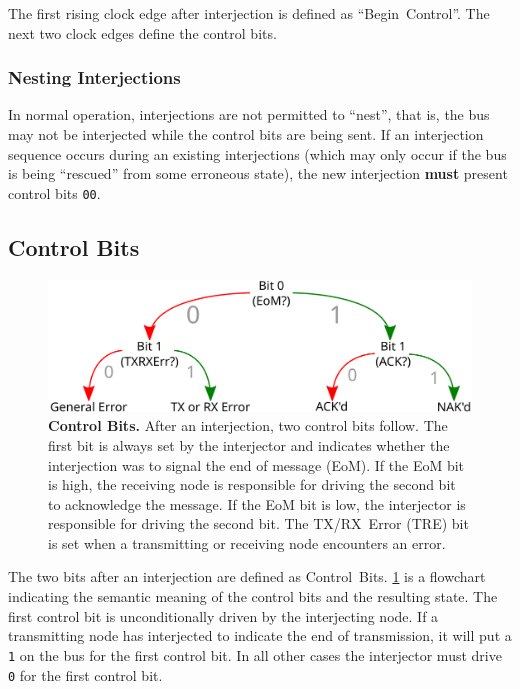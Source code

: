 The first rising clock edge after interjection is defined as ``Begin~Control''.
The next two clock edges define the control bits.

\subsubsection{Nesting Interjections}
In normal operation, interjections are not permitted to ``nest'', that is, the
bus may not be interjected while the control bits are being sent. If an
interjection sequence occurs during an existing interjections (which may only
occur if the bus is being ``rescued'' from some erroneous state), the new
interjection {\bf must} present control bits {\tt 00}.

\subsection{Control Bits}
\label{sec:bus-control}

\begin{figure}
  \includegraphics[width=\linewidth]{img/control_bits}
  \caption{\textbf{Control Bits.} \textmd{
      After an interjection, two control bits follow. The first bit is always
      set by the interjector and indicates whether the interjection was to
      signal the end of message (EoM). If the EoM bit is high, the receiving
      node is responsible for driving the second bit to acknowledge the
      message.  If the EoM bit is low, the interjector is responsible for
      driving the second bit. The TX/RX~Error (TRE) bit is set when a
      transmitting or receiving node encounters an error.
  }}
  \label{fig:control-bits}
\end{figure}

The two bits after an interjection are defined as Control~Bits.
\cref{fig:control-bits} is a flowchart indicating the semantic meaning
of the control bits and the resulting state. The first control bit is
unconditionally driven by the interjecting node. If a transmitting node has
interjected to indicate the end of transmission, it will put a {\tt 1} on the
bus for the first control bit. In all other cases the interjector must drive
{\tt 0} for the first control bit.

